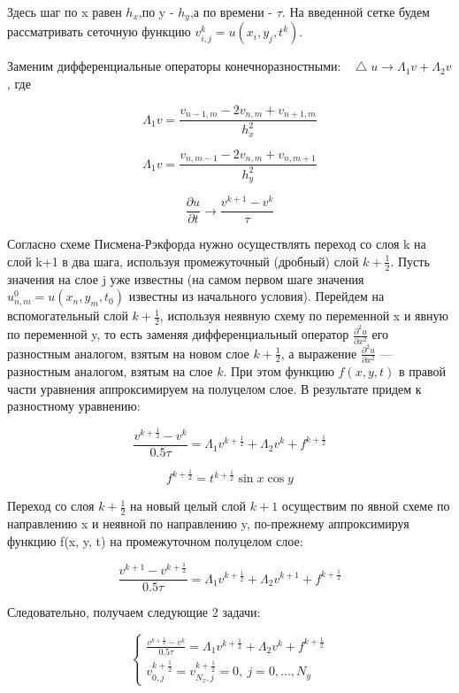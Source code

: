 \documentclass[a4paper,14pt]{article}
\newcommand*\Laplace{\mathop{}\!\mathbin\bigtriangleup}
\begin{document}
Здесь шаг по x равен $h_x$,по y - $h_y$,а по времени - $\tau$. На введенной сетке будем рассматривать сеточную функцию  $v_{i,j}^k=u(x_i,y_j,t^k)$.

Заменим дифференциальные операторы конечноразностными: $\Laplace u \rightarrow \Lambda_1 v + \Lambda_2 v$, где 

$$\Lambda_1 v = \frac{v_{n-1,m}-2v_{n,m}+v_{n+1,m}}{h_x^2}$$

$$\Lambda_1 v = \frac{v_{n,m-1}-2v_{n,m}+v_{n,m+1}}{h_y^2}$$

$$\frac{\partial u}{\partial t} \rightarrow \frac{v^{k+1}-v^k}{\tau}$$

Согласно схеме Писмена-Рэкфорда нужно осуществлять переход со слоя k на слой k+1 в два шага, используя промежуточный (дробный) слой $k + \frac{1}{2}$. Пусть значения на слое j уже известны (на самом первом шаге значения
$u_{n,m}^0 = u(x_n, y_m, t_0)$ известны из начального условия). Перейдем на вспомогательный слой $k + \frac{1}{2}$, используя неявную схему по переменной x и явную по переменной y, то есть заменяя дифференциальный оператор $\frac{\partial^2u}{\partial x^2}$ его разностным аналогом, взятым на новом слое $k + \frac{1}{2}$, а выражение $\frac{\partial^2u}{\partial x^2}$ — разностным аналогом, взятым на слое $k$. При этом функцию $f(x, y, t)$ в правой части уравнения аппроксимируем на полуцелом слое. В результате придем к разностному уравнению:

$$\frac{v^{k+\frac{1}{2}}-v^k}{0.5\tau} = \Lambda_1 v^{k+\frac{1}{2}} + \Lambda_2 v^k + f^{k+\frac{1}{2}}$$

$$f^{k+\frac{1}{2}}=t^{k+\frac{1}{2}} \sin x \cos y$$

Переход со слоя $k+\frac{1}{2}$ на новый целый слой $k +1$ осуществим по явной схеме по направлению x и неявной по направлению y, по-прежнему аппроксимируя функцию f(x, y, t) на промежуточном полуцелом слое:

$$\frac{v^{k+1}-v^{k+\frac{1}{2}}}{0.5\tau} = \Lambda_1 v^{k+\frac{1}{2}} + \Lambda_2 v^{k+1} + f^{k+\frac{1}{2}}$$

\noindent Следовательно, получаем следующие 2 задачи:

\begin{equation*}
\begin{cases}
   \frac{v^{k+\frac{1}{2}}-v^k}{0.5\tau} = \Lambda_1 v^{k+\frac{1}{2}} + \Lambda_2 v^k + f^{k+\frac{1}{2}} \\
   v^{k+\frac{1}{2}}_{0, j} = v^{k+\frac{1}{2}}_{N_x,j}=0, \ j=0,...,N_y
 \end{cases}
\end{equation*}
\end{document}
